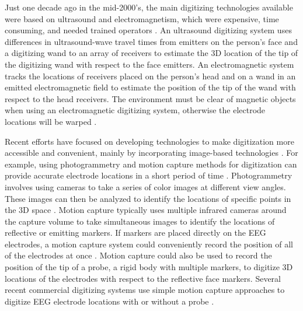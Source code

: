 \documentclass{UCF_ETD}
\renewcommand{\ul}{}
\begin{document}
Just one decade ago in the mid-2000's, the main digitizing technologies available were based on ultrasound and electromagnetism, which were expensive, time consuming, and needed trained operators \citep{Koessler2007-qg,Rodriguez-Calvache2018-qi}. An ultrasound digitizing system uses differences in ultrasound-wave travel times from emitters on \ul{the person's face and} a digitizing wand to an array of receivers to estimate the 3D location of the tip of the digitizing wand \ul{with respect to the face emitters}. An electromagnetic system tracks the locations of receivers \ul{placed on the person's head and }on a wand in an emitted electromagnetic field to estimate the position of the tip of the wand \ul{with respect to the head receivers}. The environment must be clear of magnetic objects when using an electromagnetic digitizing system, otherwise the electrode locations will be warped  \citep{Engels2013-gm,Cline2018-qo}. 

Recent efforts have focused on developing technologies to make digitization more accessible and convenient, mainly by incorporating image-based technologies \citep{Koessler2010-fm,Baysal2010-zi}. For example, using photogrammetry and motion capture methods for digitization can provide accurate electrode locations in a short period of time \citep{Clausner2017-hv,Reis2015-lt}. Photogrammetry involves using cameras to take a series of color images at different view angles. These images can then be analyzed to identify the locations of specific points in the 3D space \citep{Clausner2017-hv,Russell2005-hg}. Motion capture typically uses multiple infrared cameras around the capture volume to take simultaneous images to identify the locations of reflective or emitting markers. If markers are placed directly on the EEG electrodes, a motion capture system could conveniently record the position of all of the electrodes at once \citep{Reis2015-lt,Engels2013-gm}. Motion capture could also be used to record the position of the tip of a probe, a rigid body with multiple markers, to digitize 3D locations of \ul{the electrodes with respect to the reflective face markers}. Several recent commercial digitizing systems use simple motion capture approaches to digitize EEG electrode locations with or without a probe \citep{Song2018-qz,Cline2018-qo,Brainsight2019-tn,xensor2019-al}.
\end{document}
